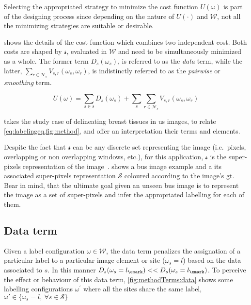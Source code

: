 Selecting the appropriated strategy to minimize the cost function $U(\omega)$ is part of the designing process since depending on the nature of $U(\cdot)$ and $\mathcal{W}$, not all the minimizing strategies are suitable or desirable.

 shows the details of the cost function which combines two independent cost.
Both costs are shaped by $\mathcal{s}$, evaluated in $\mathcal{W}$ and need to be simultaneously minimized as a whole.
The former term $D_s(\omega_s)$, is referred to as the \emph{data} term, while the latter, $\sum_{r \in \mathcal{N}_{s}} V_{s,r}(\omega_s,\omega_r)$, is indistinctly referred to as the \emph{pairwise} or \emph{smoothing} term.

\begin{equation}
  U(\omega) = \sum_{s\in s} D_s(\omega_s) + \sum_{s}\sum_{r \in \mathcal{N}_{s}} V_{s,r}(\omega_s,\omega_r)
  \label{eq:labelingeq}
\end{equation}

 takes the study case of delineating breast tissues in \ac{us} images, to relate \cref{eq:labelingeq,fig:method}, and offer an interpretation their terms and elements. 

Despite the fact that $\mathcal{s}$ can be any discrete set representing the image (i.e.\, pixels, overlapping or non overlapping windows, etc.), 
for this application, $\mathcal{s}$ is the super-pixels representation of the image~\cite{achanta2012slic}. 
 shows a \ac{bus} image example and a its associated super-pixels representation $\mathcal{S}$ coloured according to the image's \ac{gt}.
Bear in mind, that the ultimate goal given an unseen \ac{bus} image is to represent the image as a set of super-pixels and infer the appropriated labelling for each of them.

\subsection{Data term} \label{sec:method:dataTerm}

Given a label configuration $\omega \in \mathcal{W}$, the data term penalizes the assignation of a particular label to a particular image element or site ($\omega_s = l$) based on the data associated to $s$. 
In this manner $D_s(\omega_s=l_\cmark) << D_s(\omega_s=l_\xmark)$. 
To perceive the effect or behaviour of this data term, \cref{fig:methodTerms:data} shows some labelling configurations $\omega^'$ where all the sites share the same label, $\omega' \in \{ \omega_s=l,~\forall s\in\mathcal{S}\}$


